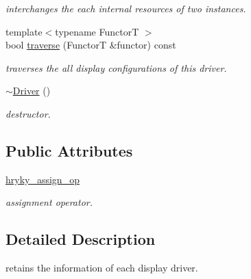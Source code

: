 \begin{DoxyCompactItemize}
\begin{DoxyCompactList}\small\item\em interchanges the each internal resources of two instances. \end{DoxyCompactList}\item 
{\footnotesize template$<$typename Functor\-T $>$ }\\bool \hyperlink{classhryky_1_1display_1_1_driver_a8e93b23dbb530da6d47c1bf250066f91}{traverse} (Functor\-T \&functor) const 
\begin{DoxyCompactList}\small\item\em traverses the all display configurations of this driver. \end{DoxyCompactList}\item 
\hypertarget{classhryky_1_1display_1_1_driver_a0618294a2748838e353efcb5b423bf54}{\hyperlink{classhryky_1_1display_1_1_driver_a0618294a2748838e353efcb5b423bf54}{$\sim$\-Driver} ()}\label{classhryky_1_1display_1_1_driver_a0618294a2748838e353efcb5b423bf54}

\begin{DoxyCompactList}\small\item\em destructor. \end{DoxyCompactList}\end{DoxyCompactItemize}
\subsection*{Public Attributes}
\begin{DoxyCompactItemize}
\item 
\hypertarget{classhryky_1_1display_1_1_driver_a054205c9ae40f8a7a7d648807a29e62f}{\hyperlink{classhryky_1_1display_1_1_driver_a054205c9ae40f8a7a7d648807a29e62f}{hryky\-\_\-assign\-\_\-op}}\label{classhryky_1_1display_1_1_driver_a054205c9ae40f8a7a7d648807a29e62f}

\begin{DoxyCompactList}\small\item\em assignment operator. \end{DoxyCompactList}\end{DoxyCompactItemize}


\subsection{Detailed Description}
retains the information of each display driver. 


